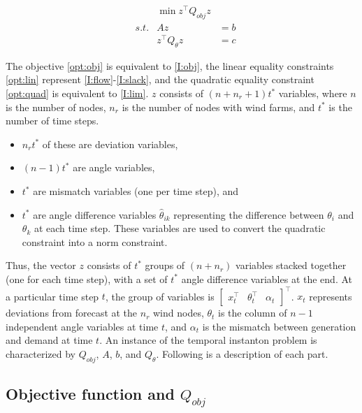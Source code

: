 \documentclass[conference]{IEEEtran}
\begin{document}
\begin{subequations}\label{opt}
\begin{align}
\label{opt:obj}  &&  \min z^\top Q_{obj} z &\\
\label{opt:lin} & s.t. & Az &= b  \\
\label{opt:quad} &&  z^\top Q_{\theta}z &= c 
\end{align}
\end{subequations}

The objective \eqref{opt:obj} is equivalent to \eqref{I:obj}, the linear equality constraints \eqref{opt:lin} represent \eqref{I:flow}-\eqref{I:slack}, and the quadratic equality constraint \eqref{opt:quad} is equivalent to \eqref{I:lim}. $z$ consists of $(n+n_r+1)t^*$ variables, where $n$ is the number of nodes, $n_r$ is the number of nodes with wind farms, and $t^*$ is the number of time steps.
\begin{itemize}
	\item $n_rt^*$ of these are deviation variables,
    \item $(n-1)t^*$ are angle variables,
    \item $t^*$ are mismatch variables (one per time step), and
    \item $t^*$ are angle difference variables $\hat{\theta}_{ik}$ representing the difference between $\theta_i$ and $\theta_k$ at each time step. These variables are used to convert the quadratic constraint into a norm constraint.
\end{itemize}

Thus, the vector $z$ consists of $t^*$ groups of $(n+n_r)$ variables stacked together (one for each time step), with a set of $t^*$ angle difference variables at the end. At a particular time step $t$, the group of variables is $\begin{bmatrix} x_t^\top & \theta_t^\top & \alpha_t \end{bmatrix}^\top$. $x_t$ represents deviations from forecast at the $n_r$ wind nodes, $\theta_t$ is the column of $n-1$ independent angle variables at time $t$, and $\alpha_t$ is the mismatch between generation and demand at time $t$. An instance of the temporal instanton problem is characterized by $Q_{obj}$, $A$, $b$, and $Q_{\theta}$. Following is a description of each part.

\subsection{Objective function and $Q_{obj}$}
\end{document}
